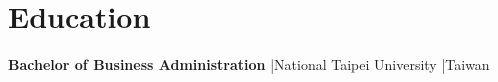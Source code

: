 \section{Education}
\textbf{Bachelor of Business Administration} \enspace|\enspace National Taipei University \enspace|\enspace Taiwan
